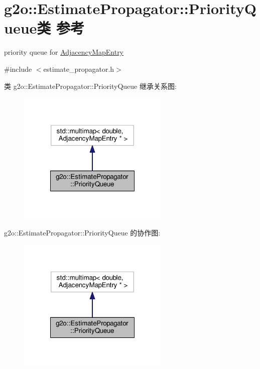 \hypertarget{classg2o_1_1EstimatePropagator_1_1PriorityQueue}{\section{g2o\-:\-:Estimate\-Propagator\-:\-:Priority\-Queue类 参考}
\label{classg2o_1_1EstimatePropagator_1_1PriorityQueue}
}


priority queue for \hyperlink{classg2o_1_1EstimatePropagator_1_1AdjacencyMapEntry}{Adjacency\-Map\-Entry}  




{\ttfamily \#include $<$estimate\-\_\-propagator.\-h$>$}



类 g2o\-:\-:Estimate\-Propagator\-:\-:Priority\-Queue 继承关系图\-:
\nopagebreak
\begin{figure}[H]
\begin{center}
\leavevmode
\includegraphics[width=204pt]{classg2o_1_1EstimatePropagator_1_1PriorityQueue__inherit__graph}
\end{center}
\end{figure}


g2o\-:\-:Estimate\-Propagator\-:\-:Priority\-Queue 的协作图\-:
\nopagebreak
\begin{figure}[H]
\begin{center}
\leavevmode
\includegraphics[width=204pt]{classg2o_1_1EstimatePropagator_1_1PriorityQueue__coll__graph}
\end{center}
\end{figure}
